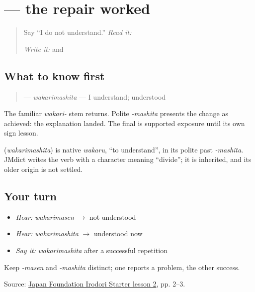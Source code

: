 \section[\texorpdfstring{\ja{わかりました} (wakarimashita)}{わかりました (wakarimashita)}]{ — the repair worked}

\label{lesson:JA-C10-wakarimashita}



\begin{quote}
Say “I do not understand.” \emph{Read it:} \textbf{}

\emph{Write it:} \textbf{} and \textbf{}
\end{quote}

\subsection*{What to know first}
\begin{quote}
\textbf{} — \emph{wakarimashita} — I understand; understood
\end{quote}

The familiar \emph{wakari-} stem returns. Polite \emph{-mashita} presents the change as achieved: the explanation landed. The final \textbf{} is supported exposure until its own sign lesson.

\begin{cousinweb}
\textbf{} (\emph{wakarimashita}) is native \emph{wakaru}, \textquotedblleft{}to understand\textquotedblright{}, in its polite past \emph{-mashita}. JMdict writes the verb with a character meaning \textquotedblleft{}divide\textquotedblright{}; it is inherited, and its older origin is not settled.
\end{cousinweb}

\subsection*{Your turn}
\begin{itemize}
\raggedright
  \item \emph{Hear:} \emph{wakarimasen} $\to$ not understood
  \item \emph{Hear:} \emph{wakarimashita} $\to$ understood now
  \item \emph{Say it:} \emph{wakarimashita} after a successful repetition
\end{itemize}

\begin{tcolorbox}[breakable,colback=teal!4,colframe=teal!35!black,title={Before you move on}]
Keep \emph{-masen} and \emph{-mashita} distinct; one reports a problem, the other success.

Source: \href{https://www.irodori.jpf.go.jp/assets/data/starter/pdf/X\_L02.pdf}{Japan Foundation Irodori Starter lesson 2}, pp. 2–3.
\end{tcolorbox}
